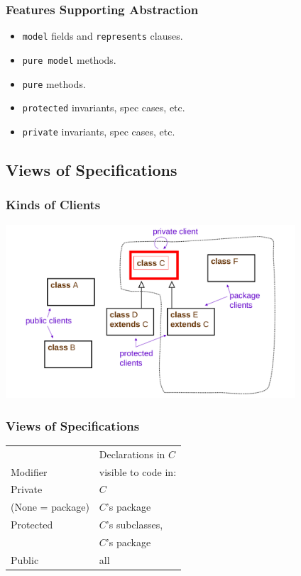 \begin{frame}[fragile]
\frametitle{Features Supporting Abstraction}

\begin{itemize}
\item
\lstinline!model! fields and \lstinline!represents! clauses.

\item
\lstinline!pure model! methods.

\item
\lstinline!pure! methods.

\item
\lstinline!protected! invariants, spec cases, etc.

\item
\lstinline!private! invariants, spec cases, etc.
\end{itemize}
\end{frame}

\subsection[Views]{Views of Specifications}

\begin{frame}
\frametitle{Kinds of Clients}
\includegraphics[width=4.25in]{visibility-modifiers}
\end{frame}

\begin{frame}
\frametitle{Views of Specifications}
\begin{tabular}{ll}
         & Declarations in $C$ \\
Modifier & visible to code in: \\
\hline
Private          & $C$ \\
(None = package) & $C$'s package \\
Protected        & $C$'s subclasses, \\
                 & $C$'s package \\
Public           & all
\end{tabular}
\end{frame}

